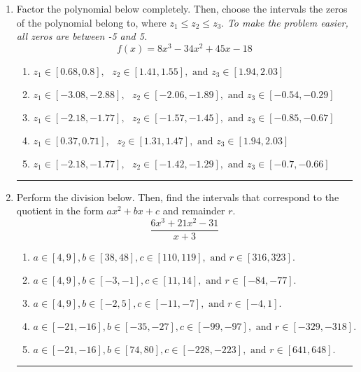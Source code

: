 \documentclass[14pt]{extbook}
\newcommand{\litem}[1]{\item#1\hspace*{-1cm}\rule{\textwidth}{0.4pt}}
\begin{document}
\begin{enumerate}
{\begin{enumerate}[label=\Alph*.]
\end{enumerate} }
\litem{
Factor the polynomial below completely. Then, choose the intervals the zeros of the polynomial belong to, where $z_1 \leq z_2 \leq z_3$. \textit{To make the problem easier, all zeros are between -5 and 5.}\[ f(x) = 8x^{3} -34 x^{2} +45 x -18 \]\begin{enumerate}[label=\Alph*.]
\item \( z_1 \in [0.68, 0.8], \text{   }  z_2 \in [1.41, 1.55], \text{   and   } z_3 \in [1.94, 2.03] \)
\item \( z_1 \in [-3.08, -2.88], \text{   }  z_2 \in [-2.06, -1.89], \text{   and   } z_3 \in [-0.54, -0.29] \)
\item \( z_1 \in [-2.18, -1.77], \text{   }  z_2 \in [-1.57, -1.45], \text{   and   } z_3 \in [-0.85, -0.67] \)
\item \( z_1 \in [0.37, 0.71], \text{   }  z_2 \in [1.31, 1.47], \text{   and   } z_3 \in [1.94, 2.03] \)
\item \( z_1 \in [-2.18, -1.77], \text{   }  z_2 \in [-1.42, -1.29], \text{   and   } z_3 \in [-0.7, -0.66] \)

\end{enumerate} }
\litem{
Perform the division below. Then, find the intervals that correspond to the quotient in the form $ax^2+bx+c$ and remainder $r$.\[ \frac{6x^{3} +21 x^{2} -31}{x + 3} \]\begin{enumerate}[label=\Alph*.]
\item \( a \in [4, 9], b \in [38, 48], c \in [110, 119], \text{ and } r \in [316, 323]. \)
\item \( a \in [4, 9], b \in [-3, -1], c \in [11, 14], \text{ and } r \in [-84, -77]. \)
\item \( a \in [4, 9], b \in [-2, 5], c \in [-11, -7], \text{ and } r \in [-4, 1]. \)
\item \( a \in [-21, -16], b \in [-35, -27], c \in [-99, -97], \text{ and } r \in [-329, -318]. \)
\item \( a \in [-21, -16], b \in [74, 80], c \in [-228, -223], \text{ and } r \in [641, 648]. \)


\end{enumerate}}
\end{enumerate}
\end{document}
